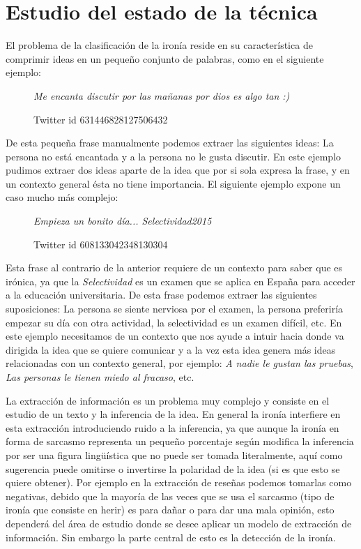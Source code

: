 \section{Estudio del estado de la técnica}
\par El problema de la clasificación de la ironía reside en su característica de comprimir ideas en un pequeño conjunto de palabras, como en el siguiente ejemplo:
\begin{figure}[ht!]

	\begin{center}
		\textit{Me encanta discutir por las mañanas por dios es algo tan :)}
	\end{center}
	\caption{\footnotesize{Twitter id 631446828127506432}}
\end{figure}

\par De esta pequeña frase manualmente podemos extraer las siguientes ideas: La persona no está encantada y a la persona no le gusta discutir. En este ejemplo pudimos extraer dos ideas aparte de la idea que por si sola expresa la frase, y en un contexto general ésta no tiene importancia. El siguiente ejemplo expone un caso mucho más complejo:
\begin{figure}[ht!]
	\centering

	\textit{Empieza un bonito día...  Selectividad2015}
	\caption{\footnotesize{Twitter id 608133042348130304}}
\end{figure}

\par Esta frase al contrario de la anterior requiere de un contexto para saber que es irónica, ya que la \textit{Selectividad} es un examen que se aplica en España para acceder a la educación universitaria. De esta frase podemos extraer las siguientes suposiciones: La persona se siente nerviosa por el examen, la persona preferiría empezar su día con otra actividad, la selectividad es un examen difícil, etc. En este ejemplo necesitamos de un contexto que nos ayude a intuir hacia donde va dirigida la idea que se quiere comunicar y a la vez esta idea genera más ideas relacionadas con un contexto general, por ejemplo: \textit{A nadie le gustan las pruebas}, \textit{Las personas le tienen miedo al fracaso}, etc.

\par La extracción de información es un problema muy complejo y consiste en el estudio de un texto y la inferencia de la idea. En general la ironía interfiere en esta extracción introduciendo ruido a la inferencia, ya que aunque la ironía en forma de sarcasmo representa un pequeño porcentaje según \cite{liu2007low} modifica la inferencia por ser una figura lingüística que no puede ser tomada literalmente, aquí como sugerencia puede omitirse o invertirse la polaridad de la idea (si es que esto se quiere obtener). Por ejemplo en la extracción de reseñas podemos tomarlas como negativas, debido que la mayoría de las veces que se usa el sarcasmo (tipo de ironía que consiste en herir) es para dañar o para dar una mala opinión, esto dependerá del área de estudio donde se desee aplicar un modelo de extracción de información. Sin embargo la parte central de esto es la detección de la ironía.

